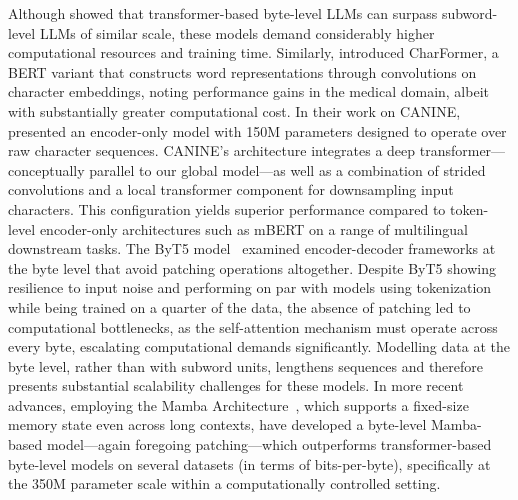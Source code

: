 Although \cite{Choe2019BridgingTG} showed that transformer-based byte-level LLMs can surpass subword-level LLMs of similar scale, these models demand considerably higher computational resources and training time. Similarly, \cite{el2020characterbert} introduced CharFormer, a BERT variant that constructs word representations through convolutions on character embeddings, noting performance gains in the medical domain, albeit with substantially greater computational cost. In their work on CANINE, \cite{clark2022canine} presented an encoder-only model with 150M parameters designed to operate over raw character sequences. CANINE’s architecture integrates a deep transformer—conceptually parallel to our global model—as well as a combination of strided convolutions and a local transformer component for downsampling input characters. This configuration yields superior performance compared to token-level encoder-only architectures such as mBERT on a range of multilingual downstream tasks. The ByT5 model~\citep{xue2022byt5} examined encoder-decoder frameworks at the byte level that avoid patching operations altogether. Despite ByT5 showing resilience to input noise and performing on par with models using tokenization while being trained on a quarter of the data, the absence of patching led to computational bottlenecks, as the self-attention mechanism must operate across every byte, escalating computational demands significantly. Modelling data at the byte level, rather than with subword units, lengthens sequences and therefore presents substantial scalability challenges for these models. In more recent advances, employing the Mamba Architecture~\citep{gu2023mamba}, which supports a fixed-size memory state even across long contexts, \cite{wang2024mambabyte} have developed a byte-level Mamba-based model—again foregoing patching—which outperforms transformer-based byte-level models on several datasets (in terms of bits-per-byte), specifically at the 350M parameter scale within a computationally controlled setting.

